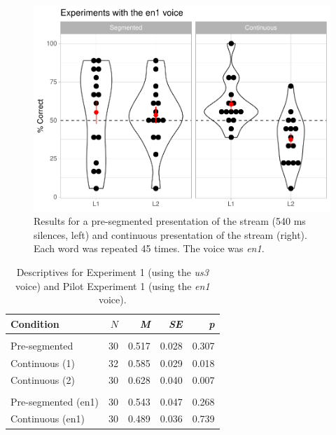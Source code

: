 \documentclass[]{article}
\newcommand{\p}{{\em p\/}}
\newcommand{\M}{{\em M\/}}
\newcommand{\SE}{{\em SE\/}}
\begin{document}
\begin{figure}

{\centering \includegraphics[width=0.8\linewidth]{segmentation_recall_combined_files/figure-latex/stats-london-stats.3x.en.segm-cont.plot-1} 

}

\caption{Results for a pre-segmented presentation of the stream (540 ms silences, left) and continuous presentation of the stream (right). Each word was repeated 45 times. The voice was {\em en1}.}\label{fig:stats-london-stats.3x.en.segm-cont.plot}
\end{figure}

\begin{table}[hpb]

\caption{\label{tab:stats-london-descriptives}Descriptives for Experiment 1 (using the {\em us3} voice) and Pilot Experiment 1 (using the {\em en1} voice).}
\centering
\begin{tabular}[t]{lrrrr}
\toprule
Condition & $N$ & \M & \SE & \p\\
\midrule
\addlinespace[0.3em]
\multicolumn{5}{l}{\textbf{us2 voice}}\\
\hspace{1em}Pre-segmented & 30 & 0.517 & 0.028 & 0.307\\
\hspace{1em}Continuous (1) & 32 & 0.585 & 0.029 & 0.018\\
\hspace{1em}Continuous (2) & 30 & 0.628 & 0.040 & 0.007\\
\addlinespace[0.3em]
\multicolumn{5}{l}{\textbf{en1 voice}}\\
\hspace{1em}Pre-segmented (en1) & 30 & 0.543 & 0.047 & 0.268\\
\hspace{1em}Continuous (en1) & 30 & 0.489 & 0.036 & 0.739\\
\bottomrule
\end{tabular}
\end{table}
\end{document}
